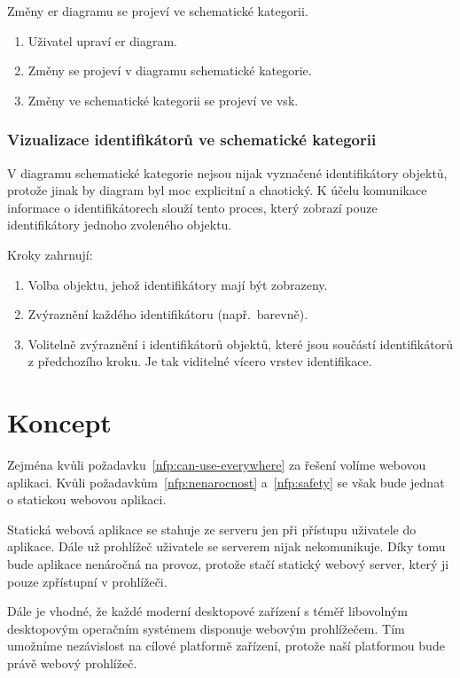 Změny \acrshort{er} diagramu se projeví ve schematické kategorii.

\begin{enumerate}
  \item Uživatel upraví \acrshort{er} diagram.
  \item Změny se projeví v diagramu schematické kategorie.
  \item Změny ve schematické kategorii se projeví ve \acrshort{vsk}.
\end{enumerate}

\subsubsection*{Vizualizace identifikátorů ve schematické kategorii}
V diagramu schematické kategorie nejsou nijak vyznačené identifikátory objektů, protože jinak by diagram byl moc explicitní a chaotický.
K účelu komunikace informace o identifikátorech slouží tento proces, který zobrazí pouze identifikátory jednoho zvoleného objektu.

Kroky zahrnují:
\begin{enumerate}
  \item Volba objektu, jehož identifikátory mají být zobrazeny.
  \item Zvýraznění každého identifikátoru (např.~barevně).
  \item Volitelně zvýraznění i identifikátorů objektů, které jsou součástí identifikátorů z předchozího kroku.
        Je tak viditelné vícero vrstev identifikace.
\end{enumerate}

\section{Koncept}

Zejména kvůli požadavku~\ref{nfp:can-use-everywhere} za řešení volíme webovou aplikaci.
Kvůli požadavkům~\ref{nfp:nenarocnost} a~\ref{nfp:safety} se však bude jednat o statickou webovou aplikaci.

Statická webová aplikace se stahuje ze serveru jen při přístupu uživatele do aplikace.
Dále už prohlížeč uživatele se serverem nijak nekomunikuje.
Díky tomu bude aplikace nenáročná na provoz, protože stačí statický webový server, který ji pouze zpřístupní v prohlížeči.

Dále je vhodné, že každé moderní desktopové zařízení s téměř libovolným desktopovým operačním systémem disponuje webovým prohlížečem.
Tím umožníme nezávislost na cílové platformě zařízení, protože naší platformou bude právě webový prohlížeč.

